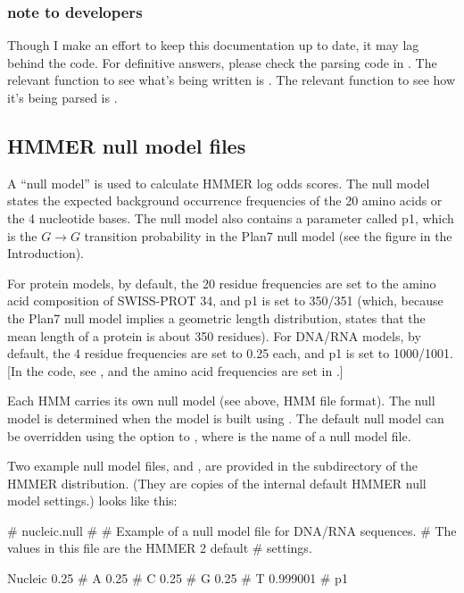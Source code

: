 \subsubsection{note to developers}

Though I make an effort to keep this documentation up to date, it may
lag behind the code. For definitive answers, please check the parsing
code in . The relevant function to see what's being
written is . The relevant function to see how it's
being parsed is .

\subsection{HMMER null model files}

A ``null model'' is used to calculate HMMER log odds scores. The null
model states the expected background occurrence frequencies of the 20
amino acids or the 4 nucleotide bases. The null model also contains a
parameter called p1, which is the $G \rightarrow G$ transition
probability in the Plan7 null model (see the figure in the
Introduction).

For protein models, by default, the 20 residue frequencies are set to
the amino acid composition of SWISS-PROT 34, and p1 is set to 350/351
(which, because the Plan7 null model implies a geometric length
distribution, states that the mean length of a protein is about 350
residues). For DNA/RNA models, by default, the 4 residue frequencies
are set to 0.25 each, and p1 is set to 1000/1001.  [In the code, see
, and the amino acid frequencies are
set in .]

Each HMM carries its own null model (see above, HMM file format).  The
null model is determined when the model is built using
. The default null model can be overridden using
the  option to , where  is
the name of a null model file.  

Two example null model files,  and
, are provided in the  subdirectory
of the HMMER distribution. (They are copies of the internal default
HMMER null model settings.)   looks like this:

\begin{sreoutput}
# nucleic.null
#
# Example of a null model file for DNA/RNA sequences.
# The values in this file are the HMMER 2 default
# settings.

Nucleic
0.25     # A
0.25     # C
0.25     # G
0.25     # T
0.999001 # p1
\end{sreoutput}

